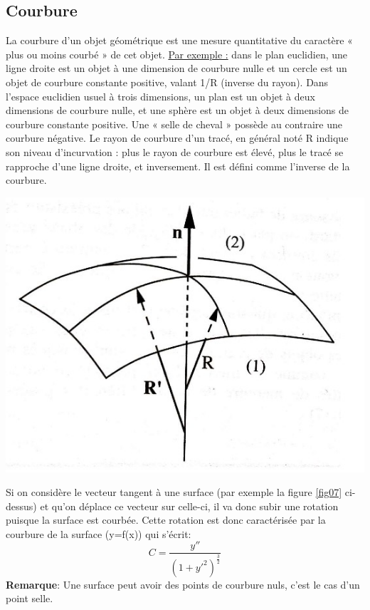 \documentclass[10pt,a4paper]{article}
\begin{document}
\subsection{Courbure}
La courbure d'un objet géométrique est une mesure quantitative du caractère « plus ou moins courbé » de cet objet. 
\newline
\newline
\underline{Par exemple :} dans le plan euclidien, une ligne droite est un objet à une dimension de courbure nulle et un cercle est un objet de courbure constante positive, valant 1/R (inverse du rayon). Dans l'espace euclidien usuel à trois dimensions, un plan est un objet à deux dimensions de courbure nulle, et une sphère est un objet à deux dimensions de courbure constante positive. Une « selle de cheval » possède au contraire une courbure négative.
\newline
\newline
Le rayon de courbure d'un tracé, en général noté R indique son niveau d'incurvation : plus le rayon de courbure est élevé, plus le tracé se rapproche d'une ligne droite, et inversement. Il est défini comme l'inverse de la courbure.
\newline
\newline
\begin{center}
\includegraphics[scale=1]{images/courbure.jpg} 
\label{fig07}
\end{center}
Si on considère le vecteur tangent à une surface (par exemple la figure \ref{fig07} ci-dessus) et qu'on déplace ce vecteur sur celle-ci, il va donc subir une rotation puisque la surface est courbée. Cette rotation est donc caractérisée par la courbure de la surface (y=f(x)) qui s'écrit:
\begin{equation}
C=\frac{y''}{(1+y'^2)^{\frac{3}{2}}}
\end{equation} 
\textbf{Remarque}: Une surface peut avoir des points de courbure nuls, c'est le cas d'un point selle.
\end{document}
